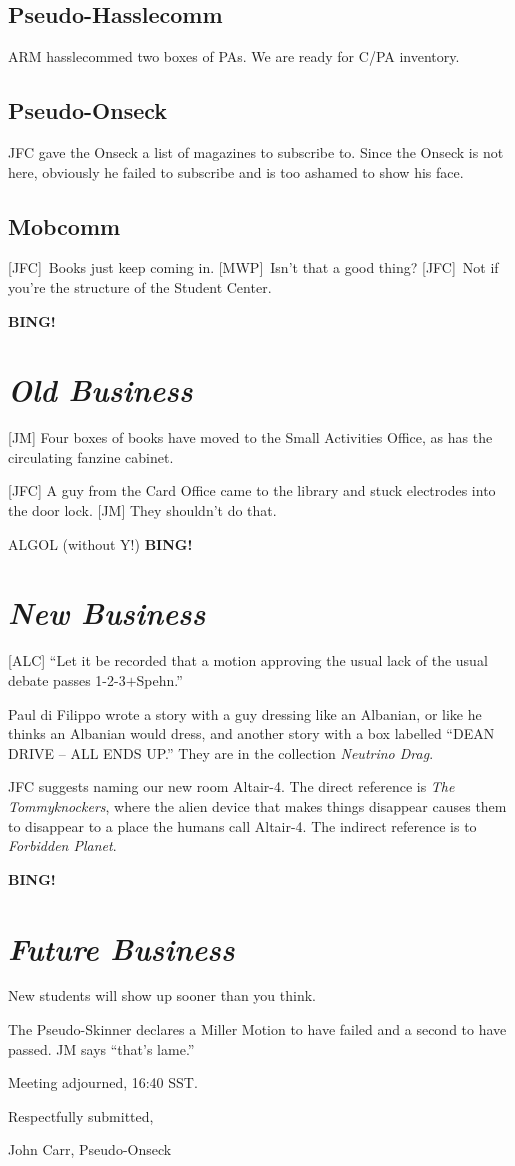 \documentclass[10pt]{article}
\newcommand{\bing}{{\bf BING!} }
\newcommand{\goto}[1]{\bing \vskip 12pt \section*{{\em{#1}}}}
\begin{document}
\subsection*{Pseudo-Hasslecomm}  ARM hasslecommed two boxes of PAs.
We are ready for C/PA inventory.

\subsection*{Pseudo-Onseck}  JFC gave the Onseck a list of magazines
to subscribe to.  Since the Onseck is not here, obviously he failed
to subscribe and is too ashamed to show his face.

\subsection*{Mobcomm}
[JFC]~Books just keep coming in.
[MWP]~Isn't that a good thing?
[JFC]~Not if you're the structure of the Student Center.


\goto{Old Business}

[JM] Four boxes of books have moved to the Small Activities Office, as
has the circulating fanzine cabinet.

[JFC] A guy from the Card Office came to the library and stuck electrodes
into the door lock.
[JM] They shouldn't do that.

ALGOL (without Y!)
\goto{New Business}

[ALC] ``Let it be recorded that a motion approving the usual lack of the
usual debate passes \hbox{1-2-3$+$Spehn}.''

Paul di Filippo wrote a story with a guy dressing like an Albanian, or like
he thinks an Albanian would dress, and another story with a box labelled
``DEAN DRIVE -- ALL ENDS UP.''  They are in the collection {\em Neutrino Drag}.

JFC suggests naming our new room Altair-4.  The direct reference is
{\em The Tommyknockers}, where the alien device that makes things
disappear causes them to disappear to a place the humans call Altair-4.
The indirect reference is to {\em Forbidden Planet}.

\goto{Future Business}

New students will show up sooner than you think.

The Pseudo-Skinner declares a Miller Motion to have failed and a
second to have passed.  JM says ``that's lame.''

\vspace{12pt}

\noindent
Meeting adjourned, 16:40 SST.

\vspace{18pt}

\centerline{Respectfully submitted,}
\centerline{John Carr,  Pseudo-Onseck}
\end{document}
